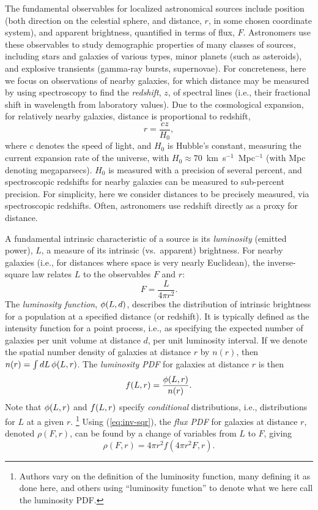 The fundamental observables for localized astronomical sources include position (both direction on the celestial sphere, and distance, $r$, in some chosen coordinate system), and apparent brightness, quantified in terms of flux, $F$.
Astronomers use these observables to study demographic properties of many classes of sources, including stars and galaxies of various types, minor planets (such as asteroids), and explosive transients (gamma-ray bursts, supernovae).
For concreteness, here we focus on observations of nearby galaxies, for which distance may be measured by using spectroscopy to find the \emph{redshift}, $z$, of spectral lines (i.e., their fractional shift in wavelength from laboratory values).
Due to the cosmological expansion, for relatively nearby galaxies, distance is proportional to redshift,
\begin{equation}
r = \frac{cz}{H_0},
\label{eq:H0}
\end{equation}
where $c$ denotes the speed of light, and $H_0$ is Hubble's constant, measuring the current expansion rate of the universe, with $H_0 \approx 70$~km~s$^{-1}$~Mpc$^{-1}$ (with Mpc denoting megaparsecs).
$H_0$ is measured with a precision of several percent, and spectroscopic redshifts for nearby galaxies can be measured to sub-percent precision.
For simplicity, here we consider distances to be precisely measured, via spectroscopic redshifts.
Often, astronomers use redshift directly as a proxy for distance.

A fundamental intrinsic characteristic of a source is its \emph{luminosity} (emitted power), $L$, a measure of its intrinsic (vs.\ apparent) brightness.
For nearby galaxies (i.e., for distances where space is very nearly Euclidean), the inverse-square law relates $L$ to the observables $F$ and $r$:
\begin{equation}
F=\frac{L}{4\pi r^2}.
\label{eq:inv-sqr}
\end{equation}
The \emph{luminosity function}, $\phi(L, d)$, describes the distribution of intrinsic brightness for a population at a specified distance (or redshift).
It is typically defined as the intensity function for a point process, i.e., as specifying the expected number of galaxies per unit volume at distance $d$, per unit luminosity interval.
If we denote the spatial number density of galaxies at distance $r$ by $n(r)$, then $n(r) = \int dL\, \phi(L, r)$.
The \emph{luminosity PDF} for galaxies at distance $r$ is then
\begin{equation}
f(L,r) = \frac{\phi(L, r)}{n(r)}.
\label{eq:lpdf}
\end{equation}
Note that $\phi(L,r)$ and $f(L,r)$ specify \emph{conditional} distributions, i.e., distributions for $L$ at a given $r$.%
\footnote{Authors vary on the definition of the luminosity function, many defining it as done here, and others using ``luminosity function'' to denote what we here call the luminosity PDF.}
Using (\ref{eq:inv-sqr}), the \emph{flux PDF} for galaxies at distance $r$, denoted $\rho(F,r)$, can be found by a change of variables from $L$ to $F$, giving
\begin{equation}\label{eq:fluxPDF}
\rho(F,r) = 4\pi r^2 f(4\pi r^2 F, r).
\end{equation}

